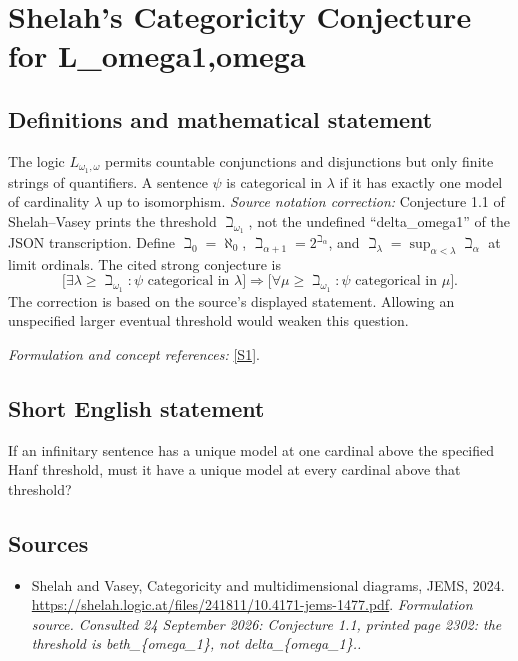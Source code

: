 \documentclass[11pt]{article}
\begin{document}
\section*{\texorpdfstring{Shelah's Categoricity Conjecture for L\_omega1,omega}{Shelah's Categoricity Conjecture for L\_omega1,omega}}\label{370}
\subsection{Definitions and mathematical statement}
The logic $L_{\omega_1,\omega}$ permits countable conjunctions and disjunctions but only finite strings of quantifiers. A sentence $\psi$ is categorical in $\lambda$ if it has exactly one model of cardinality $\lambda$ up to isomorphism. \emph{Source notation correction:} Conjecture 1.1 of Shelah--Vasey prints the threshold $\beth_{\omega_1}$, not the undefined ``delta\_omega1'' of the JSON transcription. Define $\beth_0=\aleph_0$, $\beth_{\alpha+1}=2^{\beth_\alpha}$, and $\beth_\lambda=\sup_{\alpha<\lambda}\beth_\alpha$ at limit ordinals. The cited strong conjecture is
\[
 \bigl[\exists\lambda\ge\beth_{\omega_1}:\psi\text{ categorical in }\lambda\bigr]
 \Longrightarrow
 \bigl[\forall\mu\ge\beth_{\omega_1}:\psi\text{ categorical in }\mu\bigr].
\]
The correction is based on the source's displayed statement. Allowing an unspecified larger eventual threshold would weaken this question.
\par\smallskip\textit{Formulation and concept references:} \href{https://shelah.logic.at/files/241811/10.4171-jems-1477.pdf}{[S1]}.

\subsection{Short English statement}
If an infinitary sentence has a unique model at one cardinal above the specified Hanf threshold, must it have a unique model at every cardinal above that threshold?
\subsection{Sources}
\begin{itemize}
\item[S1]Shelah and Vasey, Categoricity and multidimensional diagrams, JEMS, 2024.
\url{https://shelah.logic.at/files/241811/10.4171-jems-1477.pdf}.
\textit{Formulation source. Consulted 24 September 2026: Conjecture 1.1, printed page 2302: the threshold is beth\_\{omega\_1\}, not delta\_\{omega\_1\}..}
\end{itemize}
\end{document}
